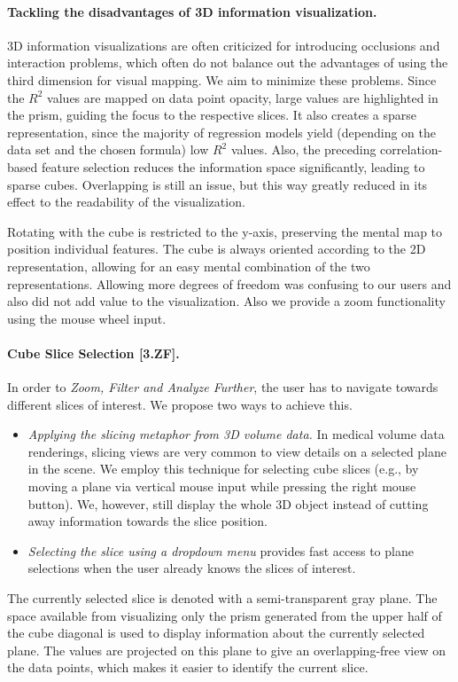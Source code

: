 \documentclass[journal]{style/vgtc} 			          %
\begin{document}
\paragraph{Tackling the disadvantages of 3D information visualization.}
3D information visualizations are often criticized for introducing occlusions and interaction problems, which often do not balance out the advantages of using the third dimension for visual mapping.
We aim to minimize these problems.
Since the $R^2$ values are mapped on data point opacity, large values are highlighted in the prism, guiding the focus to the respective slices.
It also creates a sparse representation, since the majority of regression models yield (depending on the data set and the chosen formula) low $R^2$ values.
Also, the preceding correlation-based feature selection reduces the information space significantly, leading to sparse cubes.
Overlapping is still an issue, but this way greatly reduced in its effect to the readability of the visualization.

Rotating with the cube is restricted to the y-axis, preserving the mental map to position individual features.
The cube is always oriented according to the 2D representation, allowing for an easy mental combination of the two representations.
Allowing more degrees of freedom was confusing to our users and also did not add value to the visualization.
Also we provide a zoom functionality using the mouse wheel input.
\paragraph{Cube Slice Selection [3.ZF].}
In order to \emph{Zoom, Filter and Analyze Further}, the user has to navigate towards different slices of interest.
We propose two ways to achieve this.
\begin{itemize}
	\item \emph{Applying the slicing metaphor from 3D volume data.}
	In medical volume data renderings, slicing views are very common to view details on a selected plane in the scene.
	We employ this technique for selecting cube slices (e.g., by moving a plane via vertical mouse input while pressing the right mouse button).
	We, however, still display the whole 3D object instead of cutting away information towards the slice position.
	\item \emph{Selecting the slice using a dropdown menu} provides fast access to plane selections when the user already knows the slices of interest.
\end{itemize}
The currently selected slice is denoted with a semi-transparent gray plane.
The space available from visualizing only the prism generated from the upper half of the cube diagonal is used to display information about the currently selected plane.
The values are projected on this plane to give an overlapping-free view on the data points, which makes it easier to identify the current slice.
\end{document}
